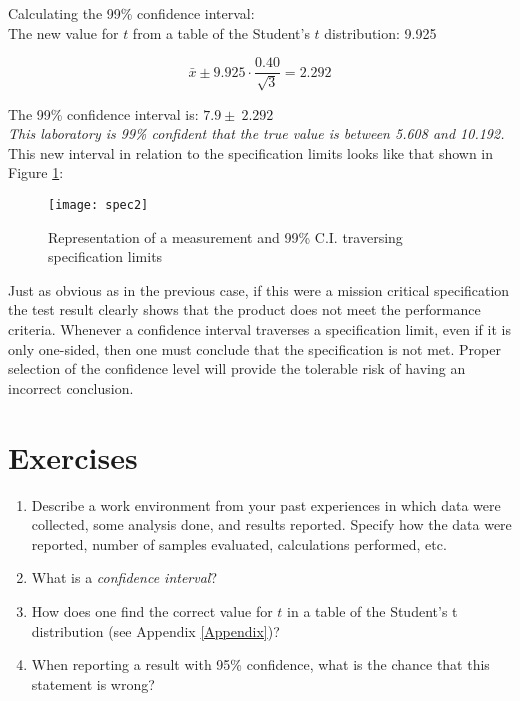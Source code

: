 Calculating the 99\% confidence interval:\\


The new value for $ t $  from a table of the Student’s $ t $ distribution: 9.925\\

\begin{center}
\begin{equation}
\bar{x} \pm 9.925 \cdot \frac{0.40}{\sqrt{3}}  = 2.292 
\end{equation}
\end{center}

The 99\% confidence interval is: $ 7.9 \pm \ 2.292 $\\


\textit{This laboratory is 99\% confident that the true value is between 5.608 and 10.192.}\\

This new interval in relation to the specification limits looks like that shown in Figure \ref{fig3}:

\begin{figure}[h]\caption{Representation of a measurement and 99\% C.I. traversing specification limits}\label{fig3}
\begin{center}
\texttt{[image: spec2]}
\end{center}
\end{figure}

Just as obvious as in the previous case, if this were a mission critical specification the test result clearly shows that the product does not meet the performance criteria.  Whenever a confidence interval traverses a specification limit, even if it is only one-sided, then one must conclude that the specification is not met.  Proper selection of the confidence level will provide the tolerable risk of having an incorrect conclusion.  
\newpage
\section{Exercises}
\begin{enumerate}
\item Describe a work environment from your past experiences in which data were collected, some analysis done, and results reported.  Specify how the data were reported, number of samples evaluated, calculations performed, etc.

\item What is a \textit{confidence interval}?

\item How does one find the correct value for $ t $ in a table of the Student's t distribution (see Appendix \ref{Appendix})?

\item When reporting a result with 95\% confidence, what is the chance that this statement is wrong?
\end{enumerate}

